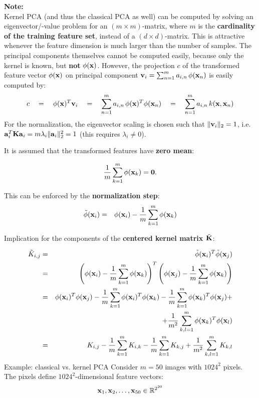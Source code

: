 	\textbf {Note:}\\

	\small
	Kernel PCA (and thus the classical PCA as well) can be computed by solving an eigenvector/-value problem for an $(m\times m)$-matrix, where $m$ is the \textbf{cardinality of the training feature set}, instead of a $(d\times d)$-matrix. This is attractive whenever the feature dimension is much larger than the number of samples. The principal components themselves cannot be computed easily, because only the kernel is known, but \textbf{not} $\phi(\bm{\mathrm{x}})$. However, the projection $c$ of the transformed feature vector $\phi(\bm{\mathrm{x}})$ on principal component $\bm{\mathrm{v}}_i= \sum_{n=1}^m a_{i,n}  \, \phi(\bm{\mathrm{x}}_n)$ is easily computed by:
		      \begin{displaymath}
			      c \quad = \quad
			      \phi( \bm{\mathrm{x}})^T \bm{\mathrm{v}}_i   \quad = \quad
			      \sum_{n=1}^m a_{i,n} \, \phi(\bm{\mathrm{x}})^T\phi(\bm{\mathrm{x}}_n) \quad   = \quad
			      \sum_{n=1}^m a_{i,n} \, k(\bm{\mathrm{x}}, \bm{\mathrm{x}}_n)
		      \end{displaymath}
	For the normalization, the eigenvector scaling is chosen such that $\|\bm{\mathrm{v}}_i\|_2=1$, i.e.\ $\bm{\mathrm{a}}_i^T\mathbf{K}\bm{\mathrm{a}}_i = m\lambda_i\|\bm{\mathrm{a}}_i\|_2^2 = 1$ (this requires $\lambda_i\neq 0$).
     
It is assumed that the transformed features have   \textbf{zero mean}:

	\begin{displaymath}
		\frac{1}{m}\sum_{k=1}^m \phi(\bm{\mathrm{x}}_k) = \bm{\mathrm{0}}.  
	\end{displaymath}

	This can be enforced by the   \textbf{normalization step}:
	\begin{eqnarray*}
		\tilde\phi(\bm{\mathrm{x}}_i) &=& \phi(\bm{\mathrm{x}}_i) - \frac{1}{m}\sum_{k=1}^m \phi(\bm{\mathrm{x}}_k)
	\end{eqnarray*}
   
	Implication for the components of the   \textbf{centered kernel matrix $\tilde {\mathbf{K}}$}:

	\small
	\begin{eqnarray*}
		\tilde{K} _{i,j}
		&=& \tilde\phi(\bm{\mathrm{x}}_i) ^T  \tilde\phi(\bm{\mathrm{x}}_j) \\  
		&=& \left( \phi(\bm{\mathrm{x}}_i) - \frac{1}{m}\sum_{k=1}^m \phi(\bm{\mathrm{x}}_k) \right)^T
		\left( \phi(\bm{\mathrm{x}}_j) - \frac{1}{m}\sum_{k=1}^m \phi(\bm{\mathrm{x}}_k) \right) \\  
		&=& \phi(\bm{\mathrm{x}}_i)^T \phi(\bm{\mathrm{x}}_j) -
		\frac{1}{m}\sum_{k=1}^m \phi(\bm{\mathrm{x}}_i)^T \phi(\bm{\mathrm{x}}_k) -
		\frac{1}{m}\sum_{k=1}^m \phi(\bm{\mathrm{x}}_k)^T  \phi(\bm{\mathrm{x}}_j) + \\
		& & \quad + \frac{1}{m^2}\sum_{k,l=1}^m \phi(\bm{\mathrm{x}}_k)^T \phi(\bm{\mathrm{x}}_l) \\  
		&=& K_{i,j} -
		\frac{1}{m}\sum_{k=1}^m K_{i,k} -
		\frac{1}{m}\sum_{k=1}^m K_{k,j} +
		\frac{1}{m^2}\sum_{k,l=1}^m K_{k,l}
	\end{eqnarray*}
   {Example: classical vs. kernel PCA}
		\small
		Consider $m=50$ images with $1024^2$ pixels.
		The pixels define $1024^2$-dimensional feature vectors:
		\begin{displaymath}
			\bm{\mathrm{x}}_1, \bm{\mathrm{x}}_2, \dots, \bm{\mathrm{x}}_{50} \in \mathbb{R}^{2^{20}}  
		\end{displaymath}

